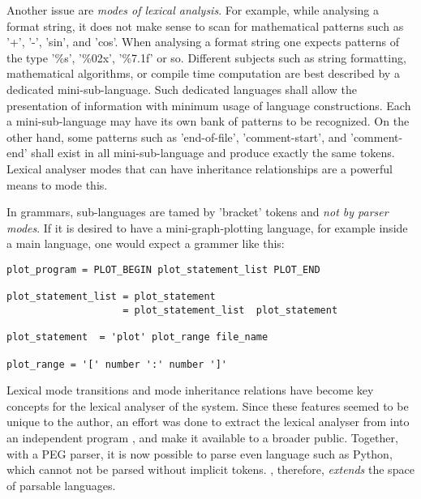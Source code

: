 Another issue are {\it modes of lexical analysis}. For example, while
analysing a format string, it does not make sense to scan for mathematical
patterns such as '+', '-', 'sin', and 'cos'. When analysing a format string
one expects patterns of the type '\%s', '\%02x', '\%7.1f' or so. Different
subjects such as string formatting, mathematical algorithms, or compile time
computation are best described by a dedicated mini-sub-language. Such
dedicated languages shall allow the presentation of information with minimum
usage of language constructions. Each a mini-sub-language may have its own
bank of patterns to be recognized. On the other hand, some patterns such as
'end-of-file', 'comment-start', and 'comment-end' shall exist in all
mini-sub-language and produce exactly the same tokens. Lexical analyser modes
that can have inheritance relationships are a powerful means to mode this.

In grammars, sub-languages are tamed by 'bracket' tokens and {\it not by
  parser modes}. If it is desired to have a mini-graph-plotting language, for
example inside a main language, one would expect a grammer like this:

\begin{lstlisting}
plot_program = PLOT_BEGIN plot_statement_list PLOT_END

plot_statement_list = plot_statement
                    = plot_statement_list  plot_statement

plot_statement  = 'plot' plot_range file_name 

plot_range = '[' number ':' number ']' 
\end{lstlisting}

Lexical mode transitions and mode inheritance relations have become key
concepts for the lexical analyser of the {\SaferTeX} system. Since these
features seemed to be unique to the author, an effort was done to extract the
lexical analyser from {\SaferTeX} into an independent program {\quex}, and
make it available to a broader public. Together, with a PEG parser\cite{}, it
is now possible to parse even language such as Python, which cannot not be
parsed without implicit tokens. {\quex}, therefore, {\it extends} the space of
parsable languages.

